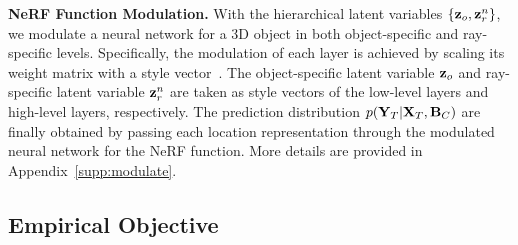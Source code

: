 \noindent  \textbf{NeRF Function Modulation.}
With the hierarchical latent variables $\{{\bf{z}}_o, {\bf{z}}_r^n\}$, we modulate a neural network for a 3D object in both object-specific and ray-specific levels.  Specifically, the modulation of each layer is achieved by scaling its weight matrix with a style vector~\citep{guo2023versatile}. 
The object-specific latent variable ${\bf{z}}_o$ and ray-specific latent variable ${\bf{z}}_r^n$ are taken as style vectors of the low-level layers and high-level layers, respectively. The prediction distribution $p({\bf{Y}}_{T}| {\bf{X}}_{T}, {\bf{B}}_{C})$ are finally obtained by passing each location representation through the modulated neural network for the NeRF function. 
More details are provided in Appendix~\ref{supp:modulate}. 




\subsection{Empirical Objective}
\label{sec: object}

